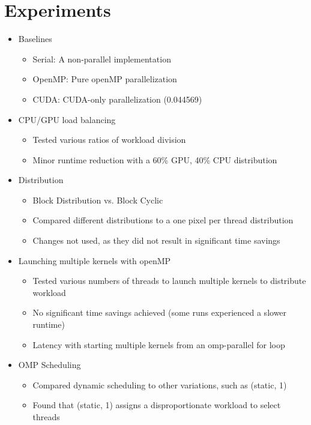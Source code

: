 \documentclass{article}
\begin{document}
\section*{Experiments}
\begin{itemize}
    \item Baselines
    \begin{itemize}
        \item Serial: A non-parallel implementation
        \item OpenMP: Pure openMP parallelization
        \item CUDA: CUDA-only parallelization (0.044569)
    \end{itemize}
    \item CPU/GPU load balancing
    \begin{itemize}
        \item Tested various ratios of workload division
        \item Minor runtime reduction with a 60\% GPU, 40\% CPU distribution
    \end{itemize}
    \item Distribution
    \begin{itemize}
        \item Block Distribution vs. Block Cyclic
        \item Compared different distributions to a one pixel per thread distribution
        \item Changes not used, as they did not result in significant time savings
    \end{itemize}
    \item Launching multiple kernels with openMP
    \begin{itemize}
        \item Tested various numbers of threads to launch multiple kernels to distribute workload
        \item No significant time savings achieved (some runs experienced a slower runtime)
        \item Latency with starting multiple kernels from an omp-parallel for loop
    \end{itemize}
    \item OMP Scheduling
    \begin{itemize}
        \item Compared dynamic scheduling to other variations, such as (static, 1)
        \item Found that (static, 1) assigns a disproportionate workload to select threads

\end{itemize}
\end{itemize}
\end{document}
